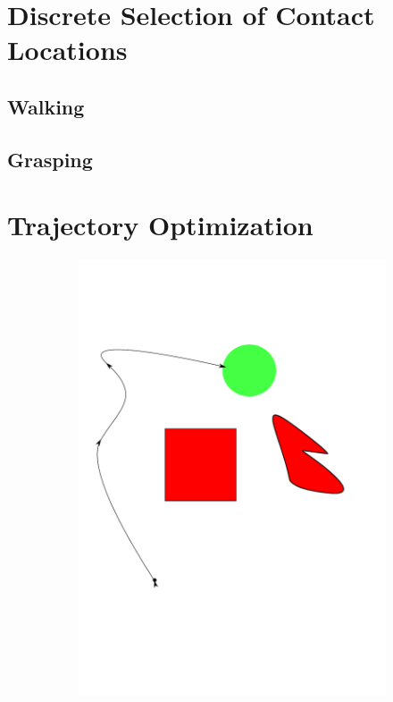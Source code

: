 \documentclass[../thesis.tex]{subfiles}
\begin{document}
\section{Discrete Selection of Contact Locations}
\subsection{Walking}
\subsection{Grasping}

\section{Trajectory Optimization}

\begin{figure}
  \centering
  \begin{subfigure}[b]{0.24\linewidth}
    \includegraphics[width=\linewidth]{./Planning/trajectory_1.pdf}

\end{subfigure}
\end{figure}
\end{document}
